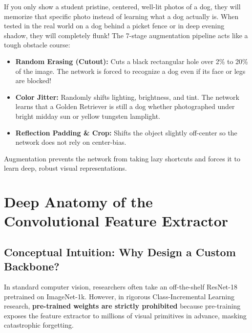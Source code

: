 \documentclass[11pt,a4paper]{article}
\begin{document}
\begin{callout}
If you only show a student pristine, centered, well-lit photos of a dog, they will memorize that specific photo instead of learning what a dog actually is. When tested in the real world on a dog behind a picket fence or in deep evening shadow, they will completely flunk!\newline
The 7-stage augmentation pipeline acts like a tough obstacle course:
\begin{itemize}[noitemsep]
    \item \textbf{Random Erasing (Cutout):} Cuts a black rectangular hole over 2\% to 20\% of the image. The network is forced to recognize a dog even if its face or legs are blocked!
    \item \textbf{Color Jitter:} Randomly shifts lighting, brightness, and tint. The network learns that a Golden Retriever is still a dog whether photographed under bright midday sun or yellow tungsten lamplight.
    \item \textbf{Reflection Padding \& Crop:} Shifts the object slightly off-center so the network does not rely on center-bias.
\end{itemize}
Augmentation prevents the network from taking lazy shortcuts and forces it to learn deep, robust visual representations.
\end{callout}

\newpage

\section{Deep Anatomy of the Convolutional Feature Extractor}
\label{sec:backbone}

\subsection{Conceptual Intuition: Why Design a Custom Backbone?}
In standard computer vision, researchers often take an off-the-shelf ResNet-18 pretrained on ImageNet-1k. However, in rigorous Class-Incremental Learning research, \textbf{pre-trained weights are strictly prohibited} because pre-training exposes the feature extractor to millions of visual primitives in advance, masking catastrophic forgetting. 
\end{document}

